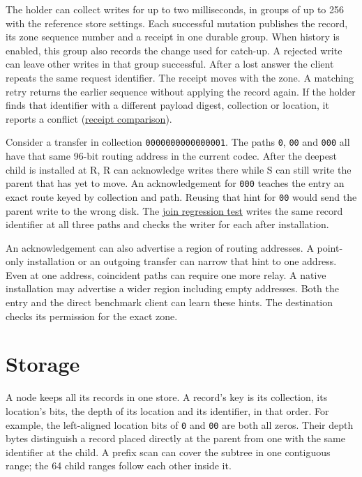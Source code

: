 \documentclass[11pt]{article}
\begin{document}
The holder can collect writes for up to two milliseconds, in groups of up to 256 with the reference store settings. Each successful mutation publishes the record, its zone sequence number and a receipt in one durable group. When history is enabled, this group also records the change used for catch-up. A rejected write can leave other writes in that group successful. After a lost answer the client repeats the same request identifier. The receipt moves with the zone. A matching retry returns the earlier sequence without applying the record again. If the holder finds that identifier with a different payload digest, collection or location, it reports a conflict (\href{https://github.com/indexus/core/blob/5188b61/internal/storage/receipts.go}{receipt comparison}).

Consider a transfer in collection \texttt{0000000000000001}. The paths \texttt{0}, \texttt{00} and \texttt{000} all have that same 96-bit routing address in the current codec. After the deepest child is installed at R, R can acknowledge writes there while S can still write the parent that has yet to move. An acknowledgement for \texttt{000} teaches the entry an exact route keyed by collection and path. Reusing that hint for \texttt{00} would send the parent write to the wrong disk. The \href{https://github.com/indexus/core/blob/e4b9072/internal/mesh/zone_identity_test.go}{join regression test} writes the same record identifier at all three paths and checks the writer for each after installation.

An acknowledgement can also advertise a region of routing addresses. A point-only installation or an outgoing transfer can narrow that hint to one address. Even at one address, coincident paths can require one more relay. A native installation may advertise a wider region including empty addresses. Both the entry and the direct benchmark client can learn these hints. The destination checks its permission for the exact zone.

\section{Storage}
A node keeps all its records in one store. A record's key is its collection, its location's bits, the depth of its location and its identifier, in that order. For example, the left-aligned location bits of \texttt{0} and \texttt{00} are both all zeros. Their depth bytes distinguish a record placed directly at the parent from one with the same identifier at the child. A prefix scan can cover the subtree in one contiguous range; the 64 child ranges follow each other inside it.
\end{document}
